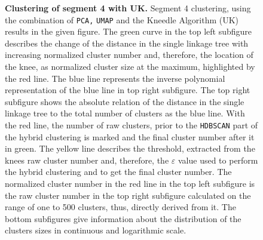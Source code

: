\begin{figure}[!hbt]
\begin{subfigure}[b]{0.475\textwidth}
    \end{subfigure}
    \caption[Clustering of segment 4 with UK]{\textbf{Clustering of segment 4 with UK.} Segment 4 clustering, using the combination of \texttt{PCA,} \texttt{UMAP} and the Kneedle Algorithm (UK) results in the given figure. The green curve in the top left subfigure describes the change of the distance in the single linkage tree with increasing normalized cluster number and, therefore, the location of the knee, as normalized cluster size at the maximum, highlighted by the red line. The blue line represents the inverse polynomial representation of the blue line in top right subfigure. The top right subfigure shows the absolute relation of the distance in the single linkage tree to the total number of clusters as the blue line. With the red line, the number of raw clusters, prior to the \texttt{HDBSCAN} part of the hybrid clustering is marked and the final cluster number after it in green. The yellow line describes the threshold, extracted from the knees raw cluster number and, therefore, the $\varepsilon$ value used to perform the hybrid clustering and to get the final cluster number. The normalized cluster number in the red line in the top left subfigure is the raw cluster number in the top right subfigure calculated on the range of one to 500 clusters, thus, directly derived from it. The bottom subfigures give information about the distribution of the clusters sizes in continuous and logarithmic scale.}
    \label{fig:UMAP_Cluster_Knee_4}
\end{figure}

\FloatBarrier
\newpage

